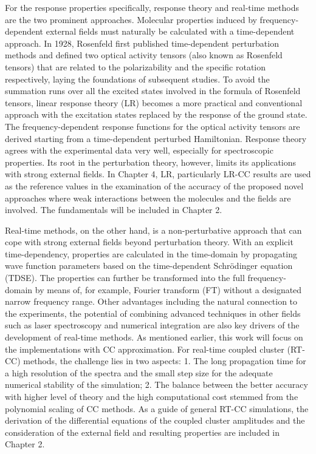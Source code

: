 For the response properties specifically, response theory and real-time methods are the two prominent approaches. Molecular properties induced by frequency-dependent external fields must naturally be calculated with a time-dependent approach. In 1928, Rosenfeld first published time-dependent perturbation methods and defined two optical activity tensors (also known as Rosenfeld tensors) that are related to the polarizability and the specific rotation respectively, laying the foundations of subsequent studies.\cite{Rosenfeld1929} To avoid the summation runs over all the excited states involved in the formula of Rosenfeld tensors, linear response theory (LR)\cite{Olsen1985, Sekino1984} becomes a more practical and conventional approach with the excitation states replaced by the response of the ground state. The frequency-dependent response functions for the optical activity tensors are derived starting from a time-dependent perturbed Hamiltonian. Response theory agrees with the experimental data very well, especially for spectroscopic properties.\cite{Kobayashi1994, Roos1996, Coriani2012} Its root in the perturbation theory, however, limits its applications with strong external fields. In Chapter 4, LR, particularly LR-CC results are used as the reference values in the examination of the accuracy of the proposed novel approaches where weak interactions between the molecules and the fields are involved. The fundamentals will be included in Chapter 2. 

Real-time methods, on the other hand, is a non-perturbative approach that can cope with strong external fields beyond perturbation theory.\cite{Goings2018, Li2020} With an explicit time-dependency, properties are calculated in the time-domain by propagating wave function parameters based on the time-dependent Schr\"odinger equation (TDSE). The properties can further be transformed into the full frequency-domain by means of, for example, Fourier transform (FT) without a designated narrow frequency range. Other advantages including the natural connection to the experiments, the potential of combining advanced techniques in other fields such as laser spectroscopy and numerical integration are also key drivers of the development of real-time methods. As mentioned earlier, this work will focus on the implementations with CC approximation. For real-time coupled cluster (RT-CC) methods, the challenge lies in two aspects: 1. The long propagation time for a high resolution of the spectra and the small step size for the adequate numerical stability of the simulation; 2. The balance between the better accuracy with higher level of theory and the high computational cost stemmed from the polynomial scaling of CC methods. As a guide of general RT-CC simulations, the derivation of the differential equations of the coupled cluster amplitudes and the consideration of the external field and resulting properties are included in Chapter 2. 

